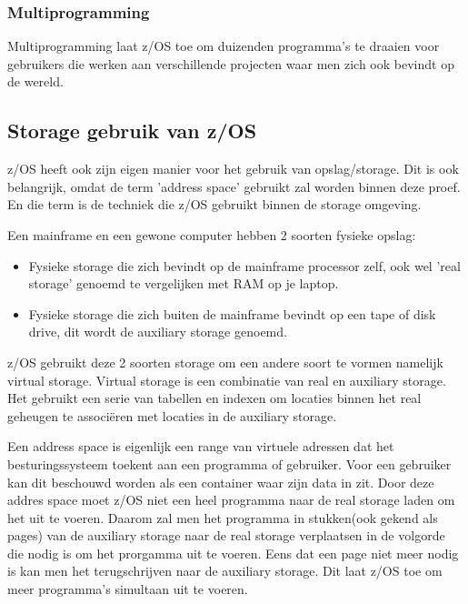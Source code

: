 \subsubsection{Multiprogramming}
\label{subsubsec:Multiprogramming}
Multiprogramming laat z/OS toe om duizenden programma's te draaien voor gebruikers die werken aan verschillende projecten waar men zich ook bevindt op de wereld.

\subsection{Storage gebruik van z/OS}
\label{subsec:Storage gebruik van z/OS}

z/OS heeft ook zijn eigen manier voor het gebruik van opslag/storage. Dit is ook belangrijk, omdat de term 'address space' gebruikt zal worden binnen deze proef. En die term is de techniek die z/OS gebruikt binnen de storage omgeving.

Een mainframe en een gewone computer hebben 2 soorten fysieke opslag:

\begin{itemize}
	\item Fysieke storage die zich bevindt op de mainframe processor zelf, ook wel 'real storage' genoemd te vergelijken met RAM op je laptop.
	\item Fysieke storage die zich buiten de mainframe bevindt op een tape of disk drive, dit wordt de auxiliary storage genoemd.
\end{itemize}

z/OS gebruikt deze 2 soorten storage om een andere soort te vormen namelijk virtual storage. Virtual storage is een combinatie van real en auxiliary storage. Het gebruikt een serie van tabellen en indexen om locaties binnen het real geheugen te associëren met locaties in de auxiliary storage.

Een address space is eigenlijk een range van virtuele adressen dat het besturingssysteem toekent aan een programma of gebruiker. Voor een gebruiker kan dit beschouwd worden als een container waar zijn data in zit. Door deze addres space moet z/OS niet een heel programma naar de real storage laden om het uit te voeren. Daarom zal men het programma in stukken(ook gekend als pages) van de auxiliary storage naar de real storage verplaatsen in de volgorde die nodig is om het prorgamma uit te voeren. Eens dat een page niet meer nodig is kan men het terugschrijven naar de auxiliary storage. Dit laat z/OS toe om meer programma's simultaan uit te voeren.

